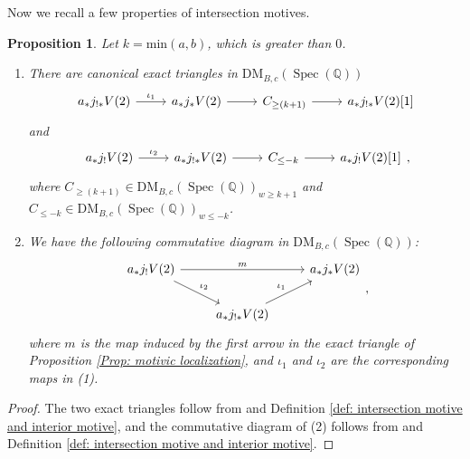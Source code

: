 \documentclass[11pt, a4paper]{amsart}
\theoremstyle{plain}
\newtheorem{proposition}[theorem]{Proposition}
\theoremstyle{definition}
\numberwithin{equation}{section}
\def\QQ{\mathbb{Q}}
\DeclareMathOperator{\Spec}{Spec}
\begin{document}
Now we recall a few properties of intersection motives. 
\begin{proposition}
Let $k = \mathrm{min}(a, b)$, which is greater than $0$. 
\begin{enumerate}
    \item There are canonical exact triangles in $\mathrm{DM}_{B, c}(\Spec(\QQ))$
         \begin{equation}
          \label{eq: exact triangle: intersection motive and j_{*}} 
            \begin{tikzcd}
                 a_{*}j_{!*}V(2) \ar[r, "\iota_{1}"] & a_{*}j_{*}V(2) \ar[r] & C_{\ge (k + 1)} \ar[r] & a_{*}j_{!*}V(2)[1]
            \end{tikzcd}
         \end{equation}
         and 
         \begin{equation}
         \label{eq: exact triangle: intersection motive and j_{!}}
             \begin{tikzcd}
                 a_{*}j_{!}V(2) \ar[r, "\iota_{2}"] & a_{*}j_{!*}V(2) \ar[r] & C_{\le {-k}} \ar[r] & a_{*}j_{!}V(2)[1]
             \end{tikzcd}, 
         \end{equation}
         where $C_{\ge (k + 1)} \in \mathrm{DM}_{B, c}(\Spec(\QQ))_{w \ge k + 1}$ and $C_{\le {-k}} \in \mathrm{DM}_{B, c}(\Spec(\QQ))_{w \le {-k}}$. 
    \item We have the following commutative diagram in $\mathrm{DM}_{B, c}(\Spec(\QQ))$: 
          \begin{equation}
           \label{eq: commutative diagram factor through j_{!} to j_{*}}
             \begin{tikzcd}
                 a_{*}j_{!}V(2) \ar[rr, "m"] \ar[rd, "\iota_{2}"]& & a_{*}j_{*}V(2) \\
                 &  a_{*}j_{!*}V(2) \ar[ru, "\iota_{1}"] & 
             \end{tikzcd}, 
          \end{equation}
          where $m$ is the map induced by the first arrow in the exact triangle of Proposition \ref{Prop: motivic localization}, and $\iota_{1}$ and $\iota_{2}$ are the corresponding maps in (1). 
\end{enumerate}
    
\end{proposition}

\begin{proof}
    The two exact triangles follow from \cite[Corollary 3.9]{Wild_15} and Definition \ref{def: intersection motive and interior motive}, and the commutative diagram of (2) follows from \cite[Theorem 2.4(c)]{Wild_09} and Definition \ref{def: intersection motive and interior motive}. 
\end{proof}
\end{document}
